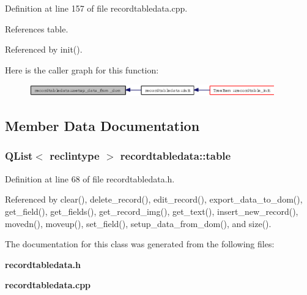 Definition at line 157 of file recordtabledata.cpp.

References table.

Referenced by init().

Here is the caller graph for this function:\begin{figure}[H]
\begin{center}
\leavevmode
\includegraphics[width=300pt]{classrecordtabledata_859f66d9b583fcc73fa8011b310d4f39_icgraph}
\end{center}
\end{figure}


\subsection{Member Data Documentation}
\subsubsection{\setlength{\rightskip}{0pt plus 5cm}QList$<$ {\bf reclintype} $>$ {\bf recordtabledata::table}\hspace{0.3cm}{\tt  [private]}}\label{classrecordtabledata_b37a33c3cb17e1feb2d012c8008899a4}




Definition at line 68 of file recordtabledata.h.

Referenced by clear(), delete\_\-record(), edit\_\-record(), export\_\-data\_\-to\_\-dom(), get\_\-field(), get\_\-fields(), get\_\-record\_\-img(), get\_\-text(), insert\_\-new\_\-record(), movedn(), moveup(), set\_\-field(), setup\_\-data\_\-from\_\-dom(), and size().

The documentation for this class was generated from the following files:\begin{CompactItemize}
\item 
{\bf recordtabledata.h}\item 
{\bf recordtabledata.cpp}\end{CompactItemize}
